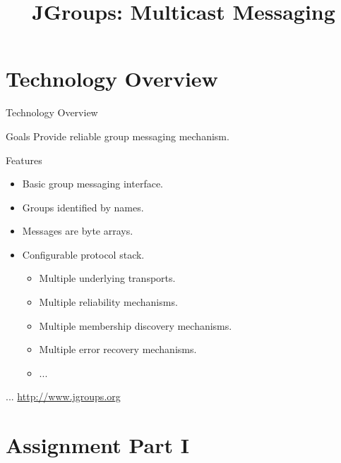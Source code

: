 \RequirePackage{slides-shared}
\title{JGroups: Multicast Messaging}



\makepreamble


\section{Technology Overview}




\begin{frame}{Technology Overview}
    \begin{block}{Goals}
        Provide reliable group messaging mechanism.
    \end{block}

    \bigskip

    \begin{block}{Features}
        \begin{itemize}
            \item Basic group messaging interface.
            \item Groups identified by names.
            \item Messages are byte arrays.
            \item Configurable protocol stack.
            \begin{itemize}
                \item Multiple underlying transports.
                \item Multiple reliability mechanisms.
                \item Multiple membership discovery mechanisms.
                \item Multiple error recovery mechanisms.
                \item ...
            \end{itemize}
        \end{itemize}
    \end{block}

    \bigskip

    \hfill ... \url{http://www.jgroups.org}
\end{frame}


\section{Assignment Part I}


